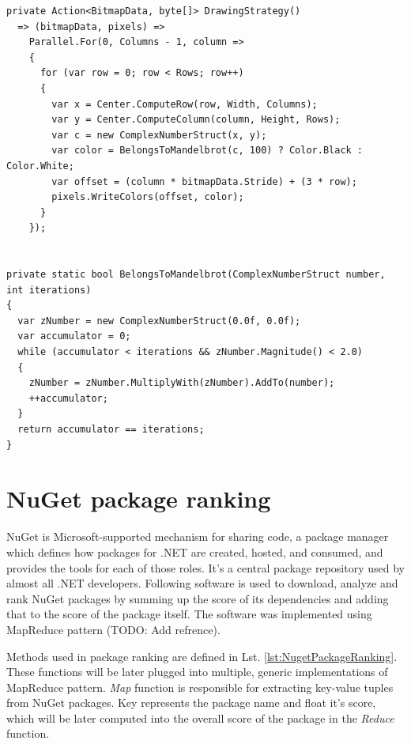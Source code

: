 \begin{lstlisting}[style=sharpcstyle, caption={Parallel Mandelbrot algorithm using value types}, label={lst:ParStructMandelbrot}]
private Action<BitmapData, byte[]> DrawingStrategy()
  => (bitmapData, pixels) =>
    Parallel.For(0, Columns - 1, column =>
    {
      for (var row = 0; row < Rows; row++)
      {
        var x = Center.ComputeRow(row, Width, Columns);
        var y = Center.ComputeColumn(column, Height, Rows);
        var c = new ComplexNumberStruct(x, y);
        var color = BelongsToMandelbrot(c, 100) ? Color.Black : Color.White;
        var offset = (column * bitmapData.Stride) + (3 * row);
        pixels.WriteColors(offset, color);
      }
    });


private static bool BelongsToMandelbrot(ComplexNumberStruct number, int iterations)
{
  var zNumber = new ComplexNumberStruct(0.0f, 0.0f);
  var accumulator = 0;
  while (accumulator < iterations && zNumber.Magnitude() < 2.0)
  {
    zNumber = zNumber.MultiplyWith(zNumber).AddTo(number);
    ++accumulator;
  }
  return accumulator == iterations;
}

\end{lstlisting}

\clearpage
\section{NuGet package ranking}
NuGet is Microsoft-supported mechanism for sharing code, a package manager which defines how packages for .NET are created, hosted, and consumed, and provides the tools for each of those roles. It's a central package repository used by almost all .NET developers. Following software is used to download, analyze and rank NuGet packages by summing up the score of its dependencies and adding that to the score of the package itself. The software was implemented using MapReduce pattern (TODO: Add refrence).

Methods used in package ranking are defined in Lst. \ref{lst:NugetPackageRanking}. These functions will be later plugged into multiple, generic implementations of MapReduce pattern. \emph{Map} function is responsible for extracting key-value tuples from NuGet packages. Key represents the package name and float it's score, which will be later computed into the overall score of the package in the \emph{Reduce} function.

